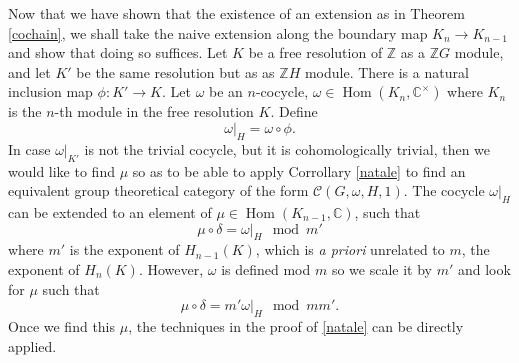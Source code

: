 \documentclass[11pt]{book}
\theoremstyle{Rem}
\theoremstyle{definition}
\numberwithin{equation}{section}
\newcommand\Hom{\operatorname{Hom}}
\newcommand\CC{\mathbb C}
\newcommand\ZZ{\mathbb Z}
\newcommand\C{\mathcal C}
\begin{document}
Now that we have shown that the existence of an extension as in Theorem \ref{cochain}, we shall take the naive extension along the boundary map $K_n\rightarrow K_{n-1}$ and show that doing so suffices. 
Let $K$ be a free resolution of $\ZZ$ as a $\ZZ G$ module, and let $K'$ be the same resolution but as as $\ZZ H$ module. There is a natural inclusion map $\phi:K'\rightarrow K$. Let $\omega$ be an $n$-cocycle, $\omega\in \Hom(K_n, \CC^\times)$ where $K_n$ is the $n$-th module in the free resolution $K$. Define \begin{equation}
	\omega|_{H} = \omega\circ \phi.
\end{equation} In case $\omega|_{K'}$ is not the trivial cocycle, but it is cohomologically trivial, then we would like to find $\mu$ so as to be able to apply Corrollary \ref{natale} to find an equivalent group theoretical category of the form $\C(G, \omega, H, 1)$. The cocycle $\omega|_H$ can be extended to an element of $\mu \in \Hom(K_{n-1}, \CC)$, such that \begin{equation}
	\mu\circ\delta = \omega|_H \mod m'
\end{equation} where $m'$ is the exponent of $H_{n-1}(K)$, which is \textit{a priori} unrelated to $m$, the exponent of $H_n(K)$. However, $\omega$ is defined mod $m$ so we scale it by $m'$ and look for $\mu$ such that \begin{equation}
	\mu\circ\delta = m'\omega|_H \mod mm'.
\end{equation}
Once we find this $\mu$, the techniques in the proof of \ref{natale} can be directly applied.
\end{document}
